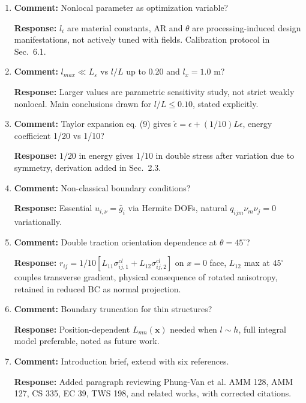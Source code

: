 \documentclass[12pt,a4paper]{article}
\begin{document}
\begin{enumerate}[leftmargin=14pt, itemsep=10pt]

\item \textbf{Comment:} Nonlocal parameter as optimization variable?

\textbf{Response:} $l_i$ are material constants, AR and $\theta$ are processing-induced design manifestations, not actively tuned with fields. Calibration protocol in Sec.~6.1.

\item \textbf{Comment:} $l_{max}\ll L_\varepsilon$ vs $l/L$ up to 0.20 and $l_x=1.0$ m?

\textbf{Response:} Larger values are parametric sensitivity study, not strict weakly nonlocal. Main conclusions drawn for $l/L\le0.10$, stated explicitly.

\item \textbf{Comment:} Taylor expansion eq. (9) gives $\tilde\epsilon=\epsilon+(1/10)L\epsilon$, energy coefficient 1/20 vs 1/10?

\textbf{Response:} $1/20$ in energy gives $1/10$ in double stress after variation due to symmetry, derivation added in Sec.~2.3.

\item \textbf{Comment:} Non-classical boundary conditions?

\textbf{Response:} Essential $u_{i,\nu}=\bar g_i$ via Hermite DOFs, natural $q_{ijm}\nu_m\nu_j=0$ variationally.

\item \textbf{Comment:} Double traction orientation dependence at $\theta=45^\circ$?

\textbf{Response:} $r_{ij}=1/10[L_{11}\sigma^{cl}_{ij,1}+L_{12}\sigma^{cl}_{ij,2}]$ on $x=0$ face, $L_{12}$ max at $45^\circ$ couples transverse gradient, physical consequence of rotated anisotropy, retained in reduced BC as normal projection.

\item \textbf{Comment:} Boundary truncation for thin structures?

\textbf{Response:} Position-dependent $L_{mn}(\mathbf x)$ needed when $l\sim h$, full integral model preferable, noted as future work.

\item \textbf{Comment:} Introduction brief, extend with six references.

\textbf{Response:} Added paragraph reviewing Phung-Van et al. AMM 128, AMM 127, CS 335, EC 39, TWS 198, and related works, with corrected citations.


\end{enumerate}
\end{document}
